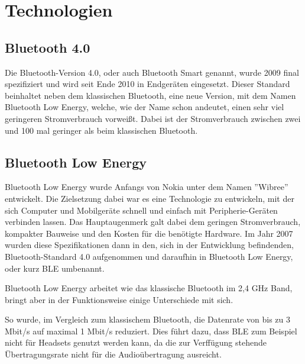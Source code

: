 \chapter{Technologien}
\label{chap:technologies}

\section{Bluetooth 4.0}
\label{sec:technologies:bluetooth4}

Die Bluetooth-Version 4.0, oder auch Bluetooth Smart genannt, wurde 2009 final spezifiziert und wird seit Ende 2010 in Endgeräten eingesetzt.
Dieser Standard beinhaltet neben dem klassischen Bluetooth, eine neue Version, mit dem Namen Bluetooth Low Energy, welche, wie der Name schon andeutet, einen sehr viel geringeren Stromverbrauch vorweißt. Dabei ist der Stromverbrauch zwischen zwei und 100 mal geringer als beim klassischen Bluetooth.


\section{Bluetooth Low Energy}
\label{sec:technologies:bluetoothLE}

Bluetooth Low Energy wurde Anfangs von Nokia unter dem Namen ''Wibree'' entwickelt. Die Zielsetzung dabei war es eine Technologie zu entwickeln, mit der sich Computer und Mobilgeräte schnell und einfach mit Peripherie-Geräten verbinden lassen. Das Hauptaugenmerk galt dabei dem geringen Stromverbrauch, kompakter Bauweise und den Kosten für die benötigte Hardware.
Im Jahr 2007 wurden diese Spezifikationen dann in den, sich in der Entwicklung befindenden, Bluetooth-Standard 4.0 aufgenommen und daraufhin in Bluetooth Low Energy, oder kurz BLE umbenannt.

Bluetooth Low Energy arbeitet wie das klassische Bluetooth im 2,4 GHz Band, bringt aber in der Funktionsweise einige Unterschiede mit sich.

So wurde, im Vergleich zum klassischem Bluetooth, die Datenrate von bis zu 3 Mbit/s auf maximal 1 Mbit/s reduziert. Dies führt dazu, dass BLE zum Beispiel nicht für Headsets genutzt werden kann, da die zur Verffügung stehende Übertragungsrate nicht für die Audioübertragung ausreicht.


